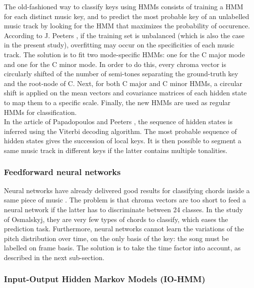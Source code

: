 \documentclass[letterpaper]{article}
\begin{document}
The old-fashioned way to classify keys using HMMs consists of training a HMM for each distinct music key, and to predict the most probable 
key of an unlabelled music track by looking for the HMM that maximizes the probability of occurence.  \\

According to J. Peeters \citep{JP}, if the training set is unbalanced (which is also the case in the present study), overfitting may occur on the specificities
of each music track. The solution is to fit two mode-specific HMMs: one for the C major mode and one for the C minor mode. In order to do this, every chroma vector is circularly shifted of the number of semi-tones separating the ground-truth key and the root-node of C. Next, for both C major and C minor HMMs, a circular shift is applied on the mean vectors and covariance matrices of each hidden state to map them to a specific scale. Finally, the new HMMs are used as regular HMMs for classification.\\

In the article of Papadopoulos and Peeters \citep{PP}, the sequence of hidden states is inferred using the Viterbi decoding algorithm. The most probable sequence of hidden states gives the succession of local keys. It is then possible to segment a same music track in different keys if the latter contains multiple tonalities.

\subsubsection{Feedforward neural networks}

Neural networks have already delivered good results for classifying chords inside a same piece of music \citep{JO}.
The problem is that chroma vectors are too short to feed a neural network if the latter has to discriminate between 24 classes. In the study of Osmalskyj, 
they are very few types of chords to classify, which eases the prediction task. Furthermore, neural networks cannot learn the variations of the pitch distribution over time, on the only basis of the key: the song must be labelled on frame basis. The solution is to take the time factor into account, as described in the next sub-section.

\subsubsection{Input-Output Hidden Markov Models (IO-HMM)}
\label{sssec:iohmm}
\end{document}
